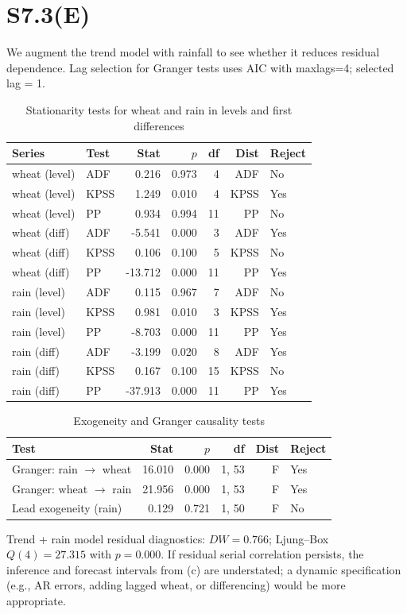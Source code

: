 \section*{S7.3(E)}
We augment the trend model with rainfall to see whether it reduces residual dependence. 
Lag selection for Granger tests uses AIC with maxlags=4; selected lag = 1.

\begin{table}[H]
\centering
\begin{tabular}{llrrrrl}
\hline
Series & Test & Stat & $p$ & df & Dist & Reject \\
\hline
wheat (level) & ADF & 0.216 & 0.973 & 4 & ADF & No \\
wheat (level) & KPSS & 1.249 & 0.010 & 4 & KPSS & Yes \\
wheat (level) & PP & 0.934 & 0.994 & 11 & PP & No \\
wheat (diff) & ADF & -5.541 & 0.000 & 3 & ADF & Yes \\
wheat (diff) & KPSS & 0.106 & 0.100 & 5 & KPSS & No \\
wheat (diff) & PP & -13.712 & 0.000 & 11 & PP & Yes \\
rain (level) & ADF & 0.115 & 0.967 & 7 & ADF & No \\
rain (level) & KPSS & 0.981 & 0.010 & 3 & KPSS & Yes \\
rain (level) & PP & -8.703 & 0.000 & 11 & PP & Yes \\
rain (diff) & ADF & -3.199 & 0.020 & 8 & ADF & Yes \\
rain (diff) & KPSS & 0.167 & 0.100 & 15 & KPSS & No \\
rain (diff) & PP & -37.913 & 0.000 & 11 & PP & Yes \\
\hline
\end{tabular}
\caption{Stationarity tests for wheat and rain in levels and first differences}
\end{table}

\begin{table}[H]
\centering
\begin{tabular}{lrrrrl}
\hline
Test & Stat & $p$ & df & Dist & Reject \\
\hline
Granger: rain $\rightarrow$ wheat & 16.010 & 0.000 & 1, 53 & F & Yes \\
Granger: wheat $\rightarrow$ rain & 21.956 & 0.000 & 1, 53 & F & Yes \\
Lead exogeneity (rain) & 0.129 & 0.721 & 1, 50 & F & No \\
\hline
\end{tabular}
\caption{Exogeneity and Granger causality tests}
\end{table}

Trend + rain model residual diagnostics: $DW=0.766$; Ljung--Box $Q(4)=27.315$ with $p=0.000$. 
If residual serial correlation persists, the inference and forecast intervals from (c) are understated; 
a dynamic specification (e.g., AR errors, adding lagged wheat, or differencing) would be more appropriate.
